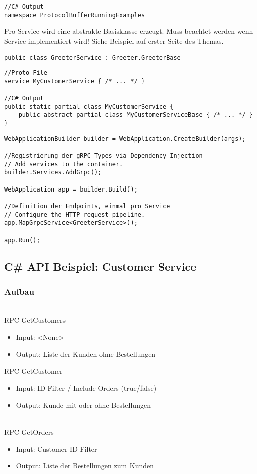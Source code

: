 \begin{multicols*}{2}
\begin{lstlisting}
//C# Output
namespace ProtocolBufferRunningExamples 
\end{lstlisting}
 Pro Service wird eine abstrakte Basisklasse erzeugt.
Muss beachtet werden wenn Service implementiert wird! Siehe Beispiel auf erster Seite des Themas.
\begin{lstlisting}
public class GreeterService : Greeter.GreeterBase
\end{lstlisting}
\begin{lstlisting}
//Proto-File
service MyCustomerService { /* ... */ }

//C# Output
public static partial class MyCustomerService {
    public abstract partial class MyCustomerServiceBase { /* ... */ }
}
\end{lstlisting}
 \begin{lstlisting}
WebApplicationBuilder builder = WebApplication.CreateBuilder(args);

//Registrierung der gRPC Types via Dependency Injection
// Add services to the container.
builder.Services.AddGrpc();

WebApplication app = builder.Build(); 

//Definition der Endpoints, einmal pro Service
// Configure the HTTP request pipeline.
app.MapGrpcService<GreeterService>();

app.Run();
\end{lstlisting}
\subsection{C\# API Beispiel: Customer Service}
\subsubsection{Aufbau}
\begin{multicols*}{2}
    \\
    RPC GetCustomers
    \begin{itemize}
        \item Input: <None>
        \item Output: Liste der Kunden ohne Bestellungen
    \end{itemize}
    RPC GetCustomer
    \begin{itemize}
        \item Input: ID Filter / Include Orders (true/false)
        \item Output: Kunde mit oder ohne Bestellungen
    \end{itemize}
\columnbreak
{}\\
RPC GetOrders
    \begin{itemize}
        \item Input: Customer ID Filter
        \item Output: Liste der Bestellungen zum Kunden
    \end{itemize}
\end{multicols*}

\end{multicols*}
